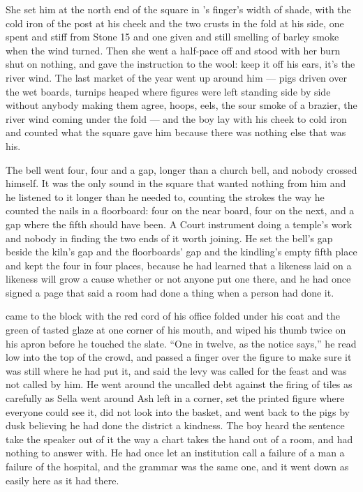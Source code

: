 She set him at the north end of the square in 's finger's width of shade, with the cold iron of the post at his cheek and the two crusts in the fold at his side, one spent and stiff from Stone 15 and one given and still smelling of barley smoke when the wind turned. Then she went a half-pace off and stood with her burn shut on nothing, and gave the instruction to the wool: keep it off his ears, it's the river wind. The last market of the year went up around him --- pigs driven over the wet boards, turnips heaped where figures were left standing side by side without anybody making them agree, hoops, eels, the sour smoke of a brazier, the river wind coming under the fold --- and the boy lay with his cheek to cold iron and counted what the square gave him because there was nothing else that was his.

The bell went four, four and a gap, longer than a church bell, and nobody crossed himself. It was the only sound in the square that wanted nothing from him and he listened to it longer than he needed to, counting the strokes the way he counted the nails in a floorboard: four on the near board, four on the next, and a gap where the fifth should have been. A Court instrument doing a temple's work and nobody in  finding the two ends of it worth joining. He set the bell's gap beside the kiln's gap and the floorboards' gap and the kindling's empty fifth place and kept the four in four places, because he had learned that a likeness laid on a likeness will grow a cause whether or not anyone put one there, and he had once signed a page that said a room had done a thing when a person had done it.

 came to the block with the red cord of his office folded under his coat and the green of tasted glaze at one corner of his mouth, and wiped his thumb twice on his apron before he touched the slate. “One in twelve, as the notice says,” he read low into the top of the crowd, and passed a finger over the figure to make sure it was still where he had put it, and said the levy was called for the feast and was not called by him. He went around the uncalled debt against the firing of tiles as carefully as Sella went around Ash left in a corner, set the printed figure where everyone could see it, did not look into the basket, and went back to the pigs by dusk believing he had done the district a kindness. The boy heard the sentence take the speaker out of it the way a chart takes the hand out of a room, and had nothing to answer with. He had once let an institution call a failure of a man a failure of the hospital, and the grammar was the same one, and it went down as easily here as it had there.

